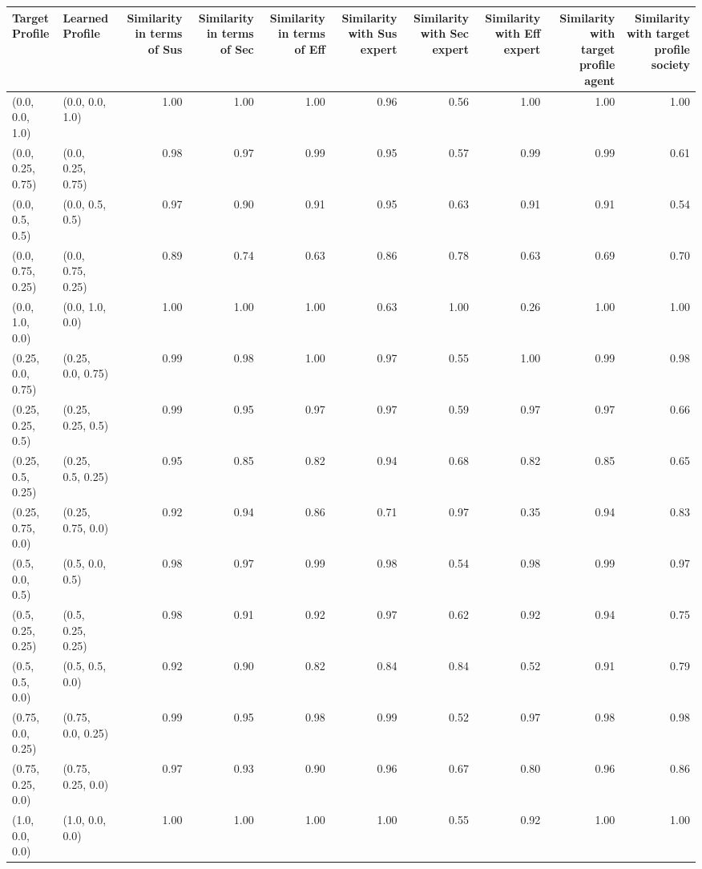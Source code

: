 \begin{tabular}{llrrrrrrrr}
\toprule
Target Profile & Learned Profile & Similarity in terms of Sus & Similarity in terms of Sec & Similarity in terms of Eff & Similarity with Sus expert & Similarity with Sec expert & Similarity with Eff expert & Similarity with target profile agent & Similarity with target profile society \\
\midrule
(0.0, 0.0, 1.0) & (0.0, 0.0, 1.0) & 1.00 & 1.00 & 1.00 & 0.96 & 0.56 & 1.00 & 1.00 & 1.00 \\
(0.0, 0.25, 0.75) & (0.0, 0.25, 0.75) & 0.98 & 0.97 & 0.99 & 0.95 & 0.57 & 0.99 & 0.99 & 0.61 \\
(0.0, 0.5, 0.5) & (0.0, 0.5, 0.5) & 0.97 & 0.90 & 0.91 & 0.95 & 0.63 & 0.91 & 0.91 & 0.54 \\
(0.0, 0.75, 0.25) & (0.0, 0.75, 0.25) & 0.89 & 0.74 & 0.63 & 0.86 & 0.78 & 0.63 & 0.69 & 0.70 \\
(0.0, 1.0, 0.0) & (0.0, 1.0, 0.0) & 1.00 & 1.00 & 1.00 & 0.63 & 1.00 & 0.26 & 1.00 & 1.00 \\
(0.25, 0.0, 0.75) & (0.25, 0.0, 0.75) & 0.99 & 0.98 & 1.00 & 0.97 & 0.55 & 1.00 & 0.99 & 0.98 \\
(0.25, 0.25, 0.5) & (0.25, 0.25, 0.5) & 0.99 & 0.95 & 0.97 & 0.97 & 0.59 & 0.97 & 0.97 & 0.66 \\
(0.25, 0.5, 0.25) & (0.25, 0.5, 0.25) & 0.95 & 0.85 & 0.82 & 0.94 & 0.68 & 0.82 & 0.85 & 0.65 \\
(0.25, 0.75, 0.0) & (0.25, 0.75, 0.0) & 0.92 & 0.94 & 0.86 & 0.71 & 0.97 & 0.35 & 0.94 & 0.83 \\
(0.5, 0.0, 0.5) & (0.5, 0.0, 0.5) & 0.98 & 0.97 & 0.99 & 0.98 & 0.54 & 0.98 & 0.99 & 0.97 \\
(0.5, 0.25, 0.25) & (0.5, 0.25, 0.25) & 0.98 & 0.91 & 0.92 & 0.97 & 0.62 & 0.92 & 0.94 & 0.75 \\
(0.5, 0.5, 0.0) & (0.5, 0.5, 0.0) & 0.92 & 0.90 & 0.82 & 0.84 & 0.84 & 0.52 & 0.91 & 0.79 \\
(0.75, 0.0, 0.25) & (0.75, 0.0, 0.25) & 0.99 & 0.95 & 0.98 & 0.99 & 0.52 & 0.97 & 0.98 & 0.98 \\
(0.75, 0.25, 0.0) & (0.75, 0.25, 0.0) & 0.97 & 0.93 & 0.90 & 0.96 & 0.67 & 0.80 & 0.96 & 0.86 \\
(1.0, 0.0, 0.0) & (1.0, 0.0, 0.0) & 1.00 & 1.00 & 1.00 & 1.00 & 0.55 & 0.92 & 1.00 & 1.00 \\
\bottomrule
\end{tabular}
